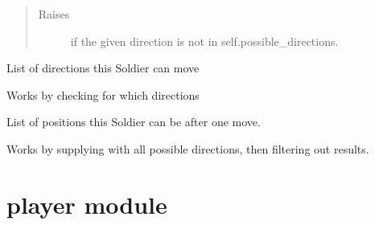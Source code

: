 \documentclass[letterpaper,10pt,english]{sphinxmanual}
\begin{document}
\begin{fulllineitems}
\begin{fulllineitems}
\begin{quote}
\begin{description}
\item[{Raises}] \leavevmode
{} \textendash{} if the given direction is not in self.possible\_directions.

\end{description}\end{quote}

\end{fulllineitems}


\begin{fulllineitems}
\label{\detokenize{neutron:neutron.Soldier.possible_directions}}
List of directions this Soldier can move

Works by checking for which directions {\hyperref[\detokenize{neutron:neutron.NeutronBoard.furthest_empty_spot}]{}}

\end{fulllineitems}


\begin{fulllineitems}
\label{\detokenize{neutron:neutron.Soldier.possible_moves}}
List of positions this Soldier can be after one move.

Works by supplying {\hyperref[\detokenize{neutron:neutron.NeutronBoard.furthest_empty_spot}]{}} with all
possible directions, then filtering out  results.

\end{fulllineitems}


\end{fulllineitems}



\section{player module}
\label{\detokenize{player:module-player}}\label{\detokenize{player:player-module}}\label{\detokenize{player::doc}}
\end{document}
